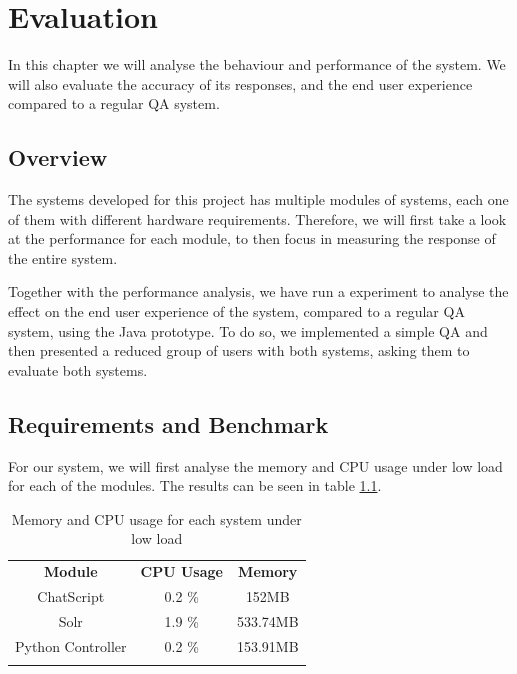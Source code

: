 \chapter{Evaluation}
\label{chap:evaluation}

\begin{chapterintro}

In this chapter we will analyse the behaviour and performance of the system. We will also evaluate the accuracy of its responses, and the end user experience compared to a regular \ac{QA} system.
 
\end{chapterintro}

\cleardoublepage

\section{Overview}

The systems developed for this project has multiple modules of systems, each one of them with different hardware requirements. Therefore, we will first take a look at the performance for each module, to then focus in measuring the response of the entire system.

Together with the performance analysis, we have run a experiment to analyse the effect on the end user experience of the system, compared to a regular \ac{QA} system, using the Java prototype. To do so, we implemented a simple \ac{QA} and then presented a reduced group of users with both systems, asking them to evaluate both systems.

\section{Requirements and Benchmark}

For our system, we will first analyse the memory and CPU usage under low load for each of the modules. The results can be seen in table \ref{tab:loadmeasures}.

\begin{table}
  \centering
  \begin{tabular*}{0.7\textwidth}{| c | c | c |}
    \hhline{|-|-|-|}
    \textbf{Module} & \textbf{CPU Usage} & \textbf{Memory} \\ \hhline{|=|=|=|}
    ChatScript & 0.2 \% &  152MB \\ \hhline{|-|-|-|}
    Solr & 1.9 \% & 533.74MB \\ \hhline{|-|-|-|}
    Python Controller & 0.2 \% & 153.91MB \\ \hhline{|-|-|-|} 
    \end{tabular*}
  \caption{Memory and CPU usage for each system under low load}
  \label{tab:loadmeasures}
\end{table}

